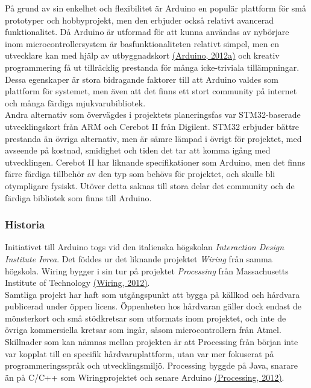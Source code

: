 \documentclass[a4paper,11pt]{article}
\begin{document}
På grund av sin enkelhet och flexibilitet är Arduino en populär plattform för små prototyper och hobbyprojekt, men den erbjuder också relativt avancerad funktionalitet. Då Arduino är utformad för att kunna användas av nybörjare inom microcontrollersystem är basfunktionaliteten relativt simpel, men en utvecklare kan med hjälp av utbyggnadskort \hyperref[arduino]{(Arduino, 2012a)} och kreativ programmering få ut tillräcklig prestanda för många icke-triviala tillämpningar. Dessa egenskaper är stora bidragande faktorer till att Arduino valdes som plattform för systemet, men även att det finns ett stort community på internet och många färdiga mjukvarubibliotek.\\

 Andra alternativ som övervägdes i projektets planeringsfas var STM32-baserade utvecklingskort från ARM och Cerebot II från Digilent. STM32 erbjuder bättre prestanda än övriga alternativ, men är sämre lämpad i övrigt för projektet, med avseende på kostnad, smidighet och tiden det tar att komma igång med utvecklingen. Cerebot II har liknande specifikationer som Arduino, men det finns färre färdiga tillbehör av den typ som behövs för projektet, och skulle bli otympligare fysiskt. Utöver detta saknas till stora delar det community och de färdiga bibliotek som finns till Arduino.\\

\subsubsection{Historia}
Initiativet till Arduino togs vid den italienska högskolan {\it Interaction Design Institute Ivrea}. Det föddes ur det liknande projektet {\it Wiring} från samma högskola. Wiring bygger i sin tur på projektet {\it Processing} från Massachusetts Institute of Technology \hyperref[wiring]{(Wiring, 2012)}. \\

Samtliga projekt har haft som utgångspunkt att bygga på källkod och hårdvara publicerad under öppen licens. Öppenheten hos hårdvaran gäller dock endast de mönsterkort och små stödkretsar som utformats inom projektet, och inte de övriga kommersiella kretsar som ingår, såsom microcontrollern från Atmel. Skillnader  som kan nämnas mellan projekten är att Processing från början inte var kopplat till en specifik hårdvaruplattform, utan var mer fokuserat på programmeringsspråk och utvecklingsmiljö. Processing byggde på Java, snarare än på C/C++ som Wiringprojektet och senare Arduino \hyperref[processing]{(Processing, 2012)}.
\end{document}
